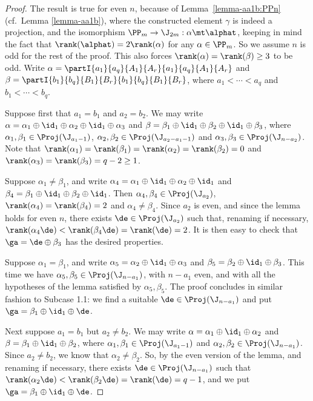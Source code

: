 \begin{proof} The result is true for even $n$, because of Lemma~\ref{lemma-aa1b:PPn} (cf.~Lemma \ref{lemma-aa1b}), where the constructed element $\gamma$ is indeed a projection, and the isomorphism ${\PP_m\to\J_{2m}:\alpha\mt\alphat}$, keeping in mind the fact that $\rank(\alphat)=2\rank(\alpha)$ for any $\alpha\in\PP_m$.  So we assume $n$ is odd for the rest of the proof.  This also forces $\rank(\alpha)=\rank(\beta)\geq3$ to be odd. Write $\alpha=\partI{a_1}{a_q}{A_1}{A_r}{a_1}{a_q}{A_1}{A_r}$ and $\beta=\partI{b_1}{b_q}{B_1}{B_r}{b_1}{b_q}{B_1}{B_r}$, where $a_1<\cdots<a_q$ and $b_1<\cdots<b_q$.



\bigskip{}  Suppose first that $a_1=b_1$ and $a_2=b_2$.  We may write $\alpha=\alpha_1\oplus\id_1\oplus\alpha_2\oplus\id_1\oplus\alpha_3$ and $\beta=\beta_1\oplus\id_1\oplus\beta_2\oplus\id_1\oplus\beta_3$, where $\alpha_1,\beta_1\in\Proj(\J_{a_1-1})$, $\alpha_2,\beta_2\in\Proj(\J_{a_2-a_1-1})$ and $\alpha_3,\beta_3\in\Proj(\J_{n-a_2})$.
%
Note that $\rank(\alpha_1)=\rank(\beta_1)=\rank(\alpha_2)=\rank(\beta_2)=0$ and $\rank(\alpha_3)=\rank(\beta_3)=q-2\geq1$.

\bigskip{}  Suppose $\alpha_1\not=\beta_1$, and write $\alpha_4=\alpha_1\oplus\id_1\oplus\alpha_2\oplus\id_1$ and $\beta_4=\beta_1\oplus\id_1\oplus\beta_2\oplus\id_1$.  Then $\alpha_4,\beta_4\in\Proj(\J_{a_2})$, $\rank(\alpha_4)=\rank(\beta_4)=2$ and $\alpha_4\not=\beta_4$.  Since $a_2$ is even, and since the lemma holds for even $n$, there exists $\de\in\Proj(\J_{a_2})$ such that, renaming if necessary, $\rank(\alpha_4\de)<\rank(\beta_4\de)=\rank(\de)=2$.  It is then easy to check that $\ga=\de\oplus\beta_3$ has the desired properties.

\bigskip{}  Suppose $\alpha_1=\beta_1$, and write $\alpha_5=\alpha_2\oplus\id_1\oplus\alpha_3$ and $\beta_5=\beta_2\oplus\id_1\oplus\beta_3$.  This time we have $\alpha_5,\beta_5\in\Proj(\J_{n-a_1})$, with $n-a_1$ even, and with all the hypotheses of the lemma satisfied by $\alpha_5,\beta_5$.  The proof concludes in similar fashion to Subcase 1.1: we find a suitable $\de\in\Proj(\J_{n-a_1})$ and put $\ga=\beta_1\oplus\id_1\oplus\de$.

\bigskip{}  Next suppose $a_1=b_1$ but $a_2\not=b_2$.  We may write $\alpha=\alpha_1\oplus\id_1\oplus\alpha_2$ and $\beta=\beta_1\oplus\id_1\oplus\beta_2$, where $\alpha_1,\beta_1\in\Proj(\J_{a_1-1})$ and $\alpha_2,\beta_2\in\Proj(\J_{n-a_1})$.  Since $a_2\not=b_2$, we know that $\alpha_2\not=\beta_2$.  So, by the even version of the lemma, and renaming if necessary, there exists $\de\in\Proj(\J_{n-a_1})$ such that $\rank(\alpha_2\de)<\rank(\beta_2\de)=\rank(\de)=q-1$, and we put $\ga=\beta_1\oplus\id_1\oplus\de$.




\end{proof}
